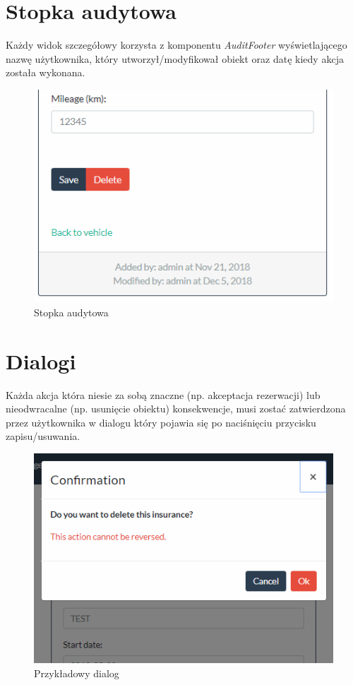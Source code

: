 \documentclass[eng,printmode,openany]{mgr}
\begin{document}
	\newpage
	\section{Stopka audytowa}
	Każdy widok szczegółowy korzysta z komponentu \textit{AuditFooter} wyświetlającego nazwę użytkownika, który utworzył/modyfikował obiekt oraz datę kiedy akcja została wykonana.
	
	\begin{figure}[H]
		\centering
		\includegraphics[scale=0.5]{images/insurance_footer.png}
		\caption{Stopka audytowa}
	\end{figure}
	
	\section{Dialogi}
	Każda akcja która niesie za sobą znaczne (np. akceptacja rezerwacji) lub nieodwracalne (np. usunięcie obiektu) konsekwencje, musi zostać zatwierdzona przez użytkownika w dialogu który pojawia się po naciśnięciu przycisku zapisu/usuwania.
	
	\begin{figure}[H]
		\centering
		\includegraphics[scale=0.7]{images/insurance_confirmation.png}
		\caption{Przykładowy dialog}
	\end{figure}
	
\end{document}
